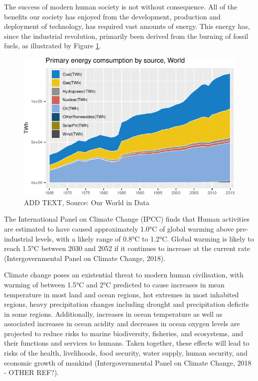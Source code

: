\documentclass[11pt,]{article}
\begin{document}
The success of modern human society is not without consequence. All of
the benefits our society has enjoyed from the development, production
and deployment of technology, has required vast amounts of energy. This
energy has, since the industrial revolution, primarily been derived from
the burning of fossil fuels, as illustrated by Figure
\ref{fig:globalEnergyPlot}.

\begin{figure}[H]

{\centering \includegraphics{MD_Final_files/figure-latex/globalEnergyPlot-1} 

}

\caption{ADD TEXT, Source: Our World in Data}\label{fig:globalEnergyPlot}
\end{figure}

The International Panel on Climate Change (IPCC) finds that Human
activities are estimated to have caused approximately 1.0°C of global
warming above pre-industrial levels, with a likely range of 0.8°C to
1.2°C. Global warming is likely to reach 1.5°C between 2030 and 2052 if
it continues to increase at the current rate (Intergovernmental Panel on
Climate Change, 2018).

Climate change poses an existential threat to modern human civilisation,
with warming of between 1.5°C and 2°C predicted to cause increases in
mean temperature in most land and ocean regions, hot extremes in most
inhabited regions, heavy precipitation changes including drought and
precipitation deficits in some regions. Additionally, increases in ocean
temperature as well as associated increases in ocean acidity and
decreases in ocean oxygen levels are projected to reduce risks to marine
biodiversity, fisheries, and ecosystems, and their functions and
services to humans. Taken together, these effects will lead to risks of
the health, livelihoods, food security, water supply, human security,
and economic growth of mankind (Intergovernmental Panel on Climate
Change, 2018 - OTHER REF?).
\end{document}
